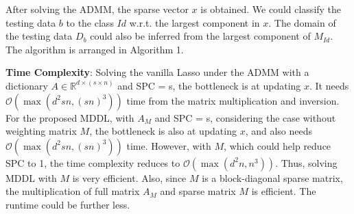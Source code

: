 \documentclass{article}
\begin{document}
After solving the ADMM, the sparse vector $x$ is obtained. We could classify the testing data $b$ to the class $Id$ w.r.t. the largest component in $x$. The domain of the testing data $D_b$ could also be inferred from the largest component of $M_{Id}$. The algorithm is arranged in Algorithm 1. 

{\bf Time Complexity}: Solving the vanilla Lasso under the ADMM with a dictionary $A \in \mathbb{R}^{d \times (s \times n)}$ and SPC = s, the bottleneck is at updating $x$. It needs $\mathcal{O}(\max( d^2 sn, (sn)^{3}))$ time from the matrix multiplication and inversion. For the proposed MDDL, with $A_M$ and SPC = s, considering the case without weighting matrix $M$, the bottleneck is also at updating $x$, and also needs $\mathcal{O}(\max( d^2 sn, (sn)^{3}))$ time. However, with $M$, which could help reduce SPC to 1, the time complexity reduces to $\mathcal{O}(\max( d^2n, n^{3}))$. Thus, solving MDDL with $M$ is very efficient. Also, since $M$ is a block-diagonal sparse matrix, the multiplication of full matrix $A_M$ and sparse matrix $M$ is efficient. The runtime could be further less.
\end{document}
